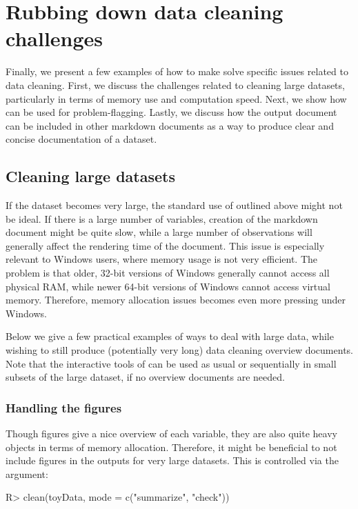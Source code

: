 \documentclass[article,shortnames]{jss}
\begin{document}
\section{Rubbing down data cleaning challenges}
\label{sec:specificExamples}

Finally, we present a few examples of how to make 
solve specific issues related to data cleaning. First, we discuss the
challenges related to cleaning large datasets, particularly in terms
of memory use and computation speed. Next, we show how 
can be used for problem-flagging. Lastly, we discuss how the
 output document can be included in other  markdown
documents as a way to produce clear and concise documentation of a
dataset.

\subsection{Cleaning large datasets}
If the dataset becomes very large, the standard use of 
outlined above might not be ideal. If there is a large number of
variables, creation of the  markdown document might be quite
slow, while a large number of observations will generally affect the
rendering time of the document. This issue is especially relevant to
Windows users, where memory usage is not very efficient. The problem is that older,
32-bit versions of Windows generally cannot access all physical RAM,
while newer 64-bit versions of Windows cannot access virtual memory. Therefore,
memory allocation issues becomes even more pressing under Windows.

Below we give a few practical examples of ways to deal with large
data, while wishing to still produce (potentially very long) data
cleaning overview documents. Note that the interactive tools of
 can be used as usual or sequentially in small subsets
of the large dataset, if no overview documents are needed.

\subsubsection{Handling the figures}
Though figures give a nice overview of each variable, they are also
quite heavy objects in terms of memory allocation. Therefore, it might
be beneficial to not include figures in the  outputs for
very large datasets. This is controlled via the  argument:

\begin{Schunk}
\begin{Sinput}
R> clean(toyData, mode = c("summarize", "check"))
\end{Sinput}
\end{Schunk}
\end{document}
